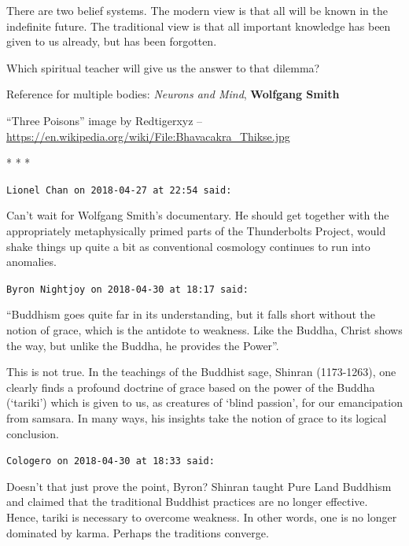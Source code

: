 There are two belief systems. The modern view is that all will be known in the indefinite future. The traditional view is that all important knowledge has been given to us already, but has been forgotten.

Which spiritual teacher will give us the answer to that dilemma?

Reference for multiple bodies: \textit{Neurons and Mind}, \textbf{Wolfgang Smith}

``Three Poisons'' image by Redtigerxyz -- \url{https://en.wikipedia.org/wiki/File:Bhavacakra_Thikse.jpg}


\begin{center}* * *\end{center}

\begin{footnotesize}
\begin{sffamily}
\texttt{Lionel Chan on 2018-04-27 at 22:54 said:}

Can't wait for Wolfgang Smith's documentary. He should get together with the appropriately metaphysically primed parts of the Thunderbolts Project, would shake things up quite a bit as conventional cosmology continues to run into anomalies.

\hfill

\texttt{Byron Nightjoy on 2018-04-30 at 18:17 said:}

``Buddhism goes quite far in its understanding, but it falls short without the notion of grace, which is the antidote to weakness. Like the Buddha, Christ shows the way, but unlike the Buddha, he provides the Power''.

This is not true. In the teachings of the Buddhist sage, Shinran (1173-1263), one clearly finds a profound doctrine of grace based on the power of the Buddha (`tariki') which is given to us, as creatures of `blind passion', for our emancipation from samsara. In many ways, his insights take the notion of grace to its logical conclusion.

\hfill

\texttt{Cologero on 2018-04-30 at 18:33 said:}

Doesn't that just prove the point, Byron? Shinran taught Pure Land Buddhism and claimed that the traditional Buddhist practices are no longer effective. Hence, tariki is necessary to overcome weakness. In other words, one is no longer dominated by karma. Perhaps the traditions converge.

\hfill


\end{sffamily}
\end{footnotesize}
